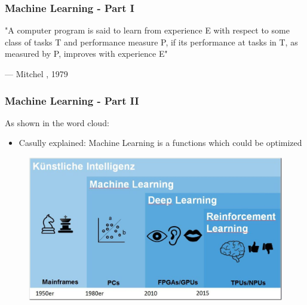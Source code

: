 \documentclass{beamer}
\begin{document}
\begin{frame}
\frametitle{Machine Learning - Part I}
\epigraph{"A computer program is said to learn from experience E with respect to some class of tasks T and performance measure P, if its performance at tasks in T, as measured by P, improves with experience E"}{--- \textup{Mitchel }, 1979}
\end{frame}
%
%
\begin{frame}
\frametitle{Machine Learning - Part II}
As shown in the word cloud:
\begin{itemize}
\item Casully explained: Machine Learning is a functions which could be optimized
\end{itemize}
\begin{figure}
\includegraphics[width=0.8\linewidth]{photo/history}
\end{figure}
\end{frame}
\end{document}
